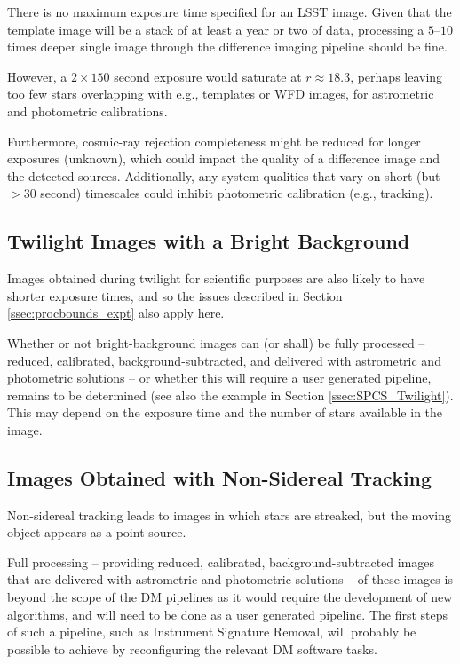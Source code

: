 There is no maximum exposure time specified for an LSST image.
Given that the template image will be a stack of at least a year or two of data, 
processing a $5$--$10$ times deeper single image through the difference imaging pipeline 
should be fine.

However, a $2\times150$ second exposure would saturate at $r \approx 18.3$, perhaps 
leaving too few stars overlapping with e.g., templates or WFD images, for astrometric and 
photometric calibrations.

Furthermore, cosmic-ray rejection completeness might be reduced for longer exposures 
(unknown), which could impact the quality of a difference image and the detected sources. 
Additionally, any system qualities that vary on short (but $>30$ second) timescales could 
inhibit photometric calibration (e.g., tracking).

\subsection{Twilight Images with a Bright Background}

Images obtained during twilight for scientific purposes are also likely to have shorter 
exposure times, and so the issues described in Section \ref{ssec:procbounds_expt} also 
apply here.

Whether or not bright-background images can (or shall) be fully processed -- reduced, 
calibrated, background-subtracted, and delivered with astrometric and photometric 
solutions -- or whether this will require a user generated pipeline, remains to be 
determined (see also the example in Section \ref{ssec:SPCS_Twilight}). 
This may depend on the exposure time and the number of stars available in the image.

\subsection{Images Obtained with Non-Sidereal Tracking}

Non-sidereal tracking leads to images in which stars are streaked, but the moving object 
appears as a point source.

Full processing -- providing reduced, calibrated, background-subtracted images that are 
delivered with astrometric and photometric solutions -- of these images is beyond the 
scope of the DM pipelines as it would require the development of new algorithms, and will 
need to be done as a user generated pipeline. 
The first steps of such a pipeline, such as Instrument Signature Removal, will probably 
be possible to achieve by reconfiguring the relevant DM software tasks.

